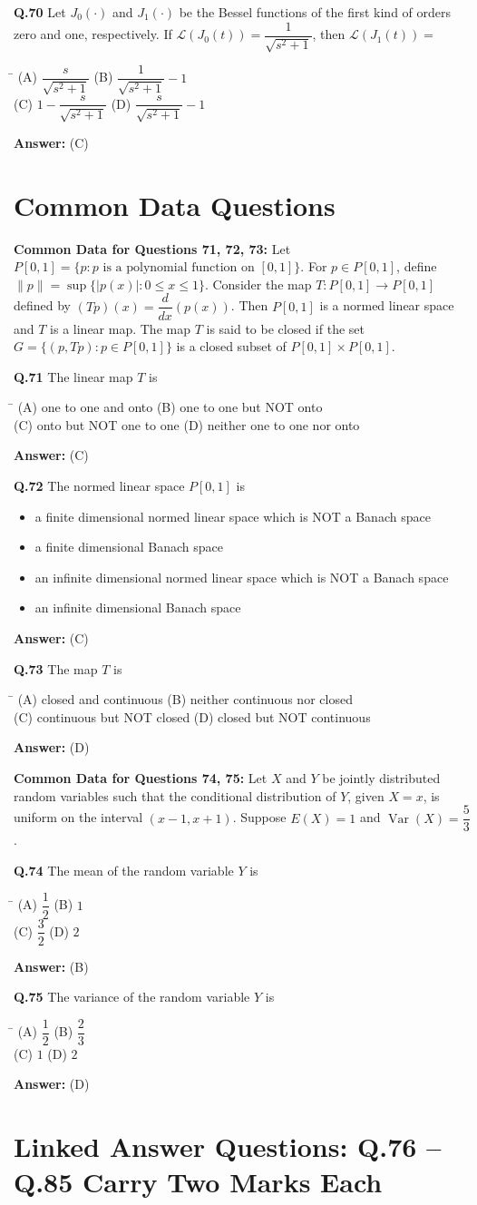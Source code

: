 \documentclass[11pt,a4paper]{article}
\newcommand{\optsfourA}[4]{%
  \begin{tabbing}
    \hspace{0.48\linewidth}\=\kill
    (A) #1 \> (B) #2 \\[2pt]
    (C) #3 \> (D) #4
  \end{tabbing}%
}
\newcommand{\optslistA}[4]{%
  \begin{itemize}
    \setlength{\itemsep}{2pt}\setlength{\parskip}{0pt}
    \item[(A)] #1
    \item[(B)] #2
    \item[(C)] #3
    \item[(D)] #4
  \end{itemize}%
}
\newcommand{\ans}[1]{\textbf{Answer:} #1\par\medskip}
\begin{document}
\textbf{Q.70} Let $J_0(\cdot)$ and $J_1(\cdot)$ be the Bessel functions of the first kind of orders zero and one, respectively. If $\mathcal{L}(J_0(t)) = \dfrac{1}{\sqrt{s^2 + 1}}$, then $\mathcal{L}(J_1(t)) =$
\optsfourA{$\dfrac{s}{\sqrt{s^2 + 1}}$}{$\dfrac{1}{\sqrt{s^2 + 1}} - 1$}{$1 - \dfrac{s}{\sqrt{s^2 + 1}}$}{$\dfrac{s}{\sqrt{s^2 + 1}} - 1$}
\ans{(C)}

\section*{Common Data Questions}

\textbf{Common Data for Questions 71, 72, 73:}
Let $P[0,1] = \{p : p \text{ is a polynomial function on } [0, 1]\}$. For $p \in P[0,1]$, define $\|p\| = \sup\{|p(x)| : 0 \le x \le 1\}$. Consider the map $T : P[0,1] \to P[0,1]$ defined by $(Tp)(x) = \dfrac{d}{dx}(p(x))$. Then $P[0,1]$ is a normed linear space and $T$ is a linear map. The map $T$ is said to be closed if the set $G = \{(p, Tp) : p \in P[0,1]\}$ is a closed subset of $P[0,1] \times P[0,1]$.

\textbf{Q.71} The linear map $T$ is
\optsfourA{one to one and onto}{one to one but NOT onto}{onto but NOT one to one}{neither one to one nor onto}
\ans{(C)}

\textbf{Q.72} The normed linear space $P[0,1]$ is
\optslistA{a finite dimensional normed linear space which is NOT a Banach space}{a finite dimensional Banach space}{an infinite dimensional normed linear space which is NOT a Banach space}{an infinite dimensional Banach space}
\ans{(C)}

\textbf{Q.73} The map $T$ is
\optsfourA{closed and continuous}{neither continuous nor closed}{continuous but NOT closed}{closed but NOT continuous}
\ans{(D)}

\medskip
\textbf{Common Data for Questions 74, 75:}
Let $X$ and $Y$ be jointly distributed random variables such that the conditional distribution of $Y$, given $X = x$, is uniform on the interval $(x - 1, x + 1)$. Suppose $E(X) = 1$ and $\operatorname{Var}(X) = \dfrac{5}{3}$.

\textbf{Q.74} The mean of the random variable $Y$ is
\optsfourA{$\dfrac{1}{2}$}{$1$}{$\dfrac{3}{2}$}{$2$}
\ans{(B)}

\textbf{Q.75} The variance of the random variable $Y$ is
\optsfourA{$\dfrac{1}{2}$}{$\dfrac{2}{3}$}{$1$}{$2$}
\ans{(D)}

\section*{Linked Answer Questions: Q.76 -- Q.85 Carry Two Marks Each}
\end{document}
